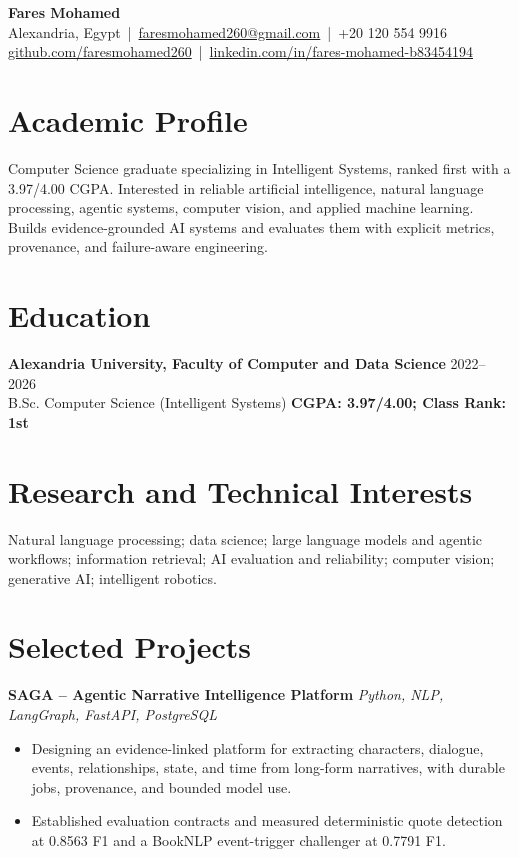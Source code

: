 \documentclass[letterpaper]{article}
\newcommand{\projectheader}[2]{\textbf{#1} \hfill \textit{#2} \\}
\begin{document}
\footnotesize
\begin{center}
{\LARGE \textbf{Fares Mohamed}}\\[3pt]
Alexandria, Egypt \,|\, \href{mailto:faresmohamed260@gmail.com}{faresmohamed260@gmail.com} \,|\, +20 120 554 9916\\
\href{https://github.com/faresmohamed260}{github.com/faresmohamed260} \,|\,
\href{https://www.linkedin.com/in/fares-mohamed-b83454194/}{linkedin.com/in/fares-mohamed-b83454194}
\end{center}

\section*{Academic Profile}
Computer Science graduate specializing in Intelligent Systems, ranked first with a 3.97/4.00 CGPA. Interested in reliable artificial intelligence, natural language processing, agentic systems, computer vision, and applied machine learning. Builds evidence-grounded AI systems and evaluates them with explicit metrics, provenance, and failure-aware engineering.

\section*{Education}
\textbf{Alexandria University, Faculty of Computer and Data Science} \hfill 2022--2026\\
B.Sc. Computer Science (Intelligent Systems) \hfill \textbf{CGPA: 3.97/4.00; Class Rank: 1st}

\section*{Research and Technical Interests}
Natural language processing; data science; large language models and agentic workflows; information retrieval; AI evaluation and reliability; computer vision; generative AI; intelligent robotics.

\section*{Selected Projects}
\projectheader{SAGA -- Agentic Narrative Intelligence Platform}{Python, NLP, LangGraph, FastAPI, PostgreSQL}
\begin{itemize}
\item Designing an evidence-linked platform for extracting characters, dialogue, events, relationships, state, and time from long-form narratives, with durable jobs, provenance, and bounded model use.
\item Established evaluation contracts and measured deterministic quote detection at 0.8563 F1 and a BookNLP event-trigger challenger at 0.7791 F1.
\end{itemize}
\end{document}
